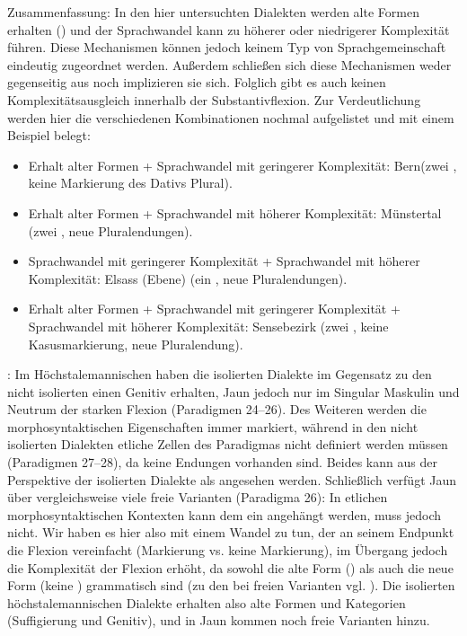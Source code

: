 Zusammenfassung: In den hier untersuchten Dialekten werden alte Formen erhalten () und der Sprachwandel kann zu höherer oder niedrigerer Komplexität führen. Diese Mechanismen können jedoch keinem Typ von Sprachgemeinschaft eindeutig zugeordnet werden. Außerdem schließen sich diese Mechanismen weder gegenseitig aus noch implizieren sie sich. Folglich gibt es auch keinen Komplexitätsausgleich innerhalb der Substantivflexion. Zur Verdeutlichung werden hier die verschiedenen Kombinationen nochmal aufgelistet und mit einem Beispiel belegt:

\begin{itemize}
\item
Erhalt alter Formen + Sprachwandel mit geringerer Komplexität: Bern\linebreak (zwei , keine Markierung des Dativs Plural).
\item
Erhalt alter Formen + Sprachwandel mit höherer Komplexität: Münstertal (zwei , neue Pluralendungen).
\item
Sprachwandel mit geringerer Komplexität + Sprachwandel mit höherer Komplexität: Elsass (Ebene) (ein , neue Pluralendungen).
\item
Erhalt alter Formen + Sprachwandel mit geringerer Komplexität + Sprachwandel mit höherer Komplexität: Sensebezirk (zwei , keine Kasusmarkierung, neue Pluralendung).
\end{itemize}

{:} Im Höchstalemannischen haben die isolierten Dialekte im Gegensatz zu den nicht isolierten einen Genitiv erhalten, Jaun jedoch nur im Singular Maskulin und Neutrum der starken Flexion (Paradigmen 24–26). Des Weiteren werden die morphosyntaktischen Eigenschaften immer markiert, während in den nicht isolierten Dialekten etliche Zellen des Paradigmas nicht definiert werden müssen (Paradigmen 27–28), da keine Endungen vorhanden sind. Beides kann aus der Perspektive der isolierten Dialekte als  angesehen werden. Schließlich verfügt Jaun über vergleichsweise viele freie Varianten (Paradigma 26): In etlichen morphosyntaktischen Kontexten kann dem  ein  angehängt werden, muss jedoch nicht. Wir haben es hier also mit einem Wandel zu tun, der an seinem Endpunkt die Flexion vereinfacht (Markierung vs. keine Markierung), im Übergang jedoch die Komplexität der Flexion erhöht, da sowohl die alte Form () als auch die neue Form (keine ) grammatisch sind (zu den  bei freien Varianten vgl. ). Die isolierten höchstalemannischen Dialekte erhalten also alte Formen und Kategorien (Suffigierung und Genitiv), und in Jaun kommen noch freie Varianten hinzu.

